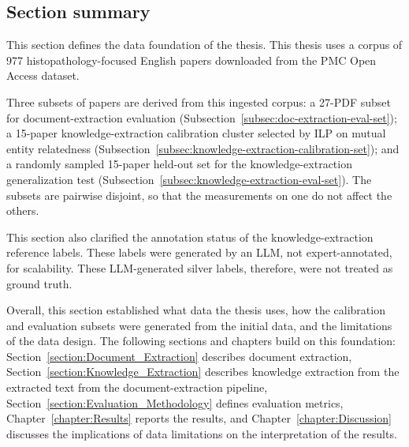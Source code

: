 \subsection{Section summary}\label{subsec:corpus-section-summary}

This section defines the data foundation of the thesis. This thesis uses a corpus of 977 histopathology-focused English papers downloaded from the PMC Open Access dataset. 

Three subsets of papers are derived from this ingested corpus: a 27-PDF subset for document-extraction evaluation (Subsection~\ref{subsec:doc-extraction-eval-set}); a 15-paper knowledge-extraction calibration cluster selected by ILP on mutual entity relatedness (Subsection~\ref{subsec:knowledge-extraction-calibration-set}); and a randomly sampled 15-paper held-out set for the knowledge-extraction generalization test (Subsection~\ref{subsec:knowledge-extraction-eval-set}). The subsets are pairwise disjoint, so that the measurements on one do not affect the others.

This section also clarified the annotation status of the knowledge-extraction reference labels. These labels were generated by an LLM, not expert-annotated, for scalability. These LLM-generated silver labels, therefore, were not treated as ground truth. 

Overall, this section established what data the thesis uses, how the calibration and evaluation subsets were generated from the initial data, and the limitations of the data design. The following sections and chapters build on this foundation: Section~\ref{section:Document_Extraction} describes document extraction, Section~\ref{section:Knowledge_Extraction} describes knowledge extraction from the extracted text from the document-extraction pipeline, Section~\ref{section:Evaluation_Methodology} defines evaluation metrics, Chapter~\ref{chapter:Results} reports the results, and Chapter~\ref{chapter:Discussion} discusses the implications of data limitations on the interpretation of the results.